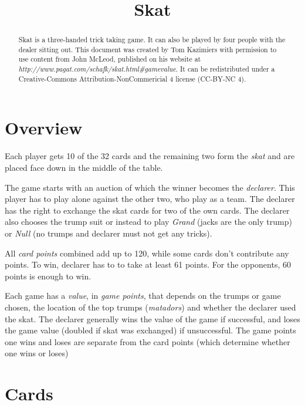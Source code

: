 \documentclass[letter]{article}
\begin{document}
  \title{Skat}
  \date{}
  \maketitle

  \begin{abstract}
    Skat is a three-handed trick taking game. It can also be played by four
    people with the dealer sitting out. This document was created by Tom
    Kazimiers with permission to use content from John McLeod, published on his
    website at \emph{http://www.pagat.com/schafk/skat.html\#gamevalue}. It can be
    redistributed under a Creative-Commons Attribution-NonCommericial 4
    license (CC-BY-NC 4).
  \end{abstract}

  \section*{Overview}

  Each player gets 10 of the 32 cards and the remaining two form the
  \emph{skat} and are placed face down in the middle of the table.

  The game starts with an auction of which the winner becomes the
  \emph{declarer}. This player has to play alone against the other two, who play
  as a team. The declarer has the right to exchange the skat cards for two of
  the own cards. The declarer also chooses the trump suit or instead to play
  \emph{Grand} (jacks are the only trump) or \emph{Null} (no trumps and declarer
  must not get any tricks).

  All \emph{card points} combined add up to 120, while some cards don't
  contribute any points. To win, declarer has to to take at least 61 points. For
  the opponents, 60 points is enough to win.

  Each game has a \emph{value}, in \emph{game points}, that depends on the
  trumps or game chosen, the location of the top trumps (\emph{matadors}) and
  whether the declarer used the skat. The declarer generally wins the value of
  the game if successful, and loses the game value (doubled if skat was
  exchanged) if unsuccessful. The game points one wins and loses are separate
  from the card points (which determine whether one wins or loses)


  \section*{Cards}
  
\end{document}
